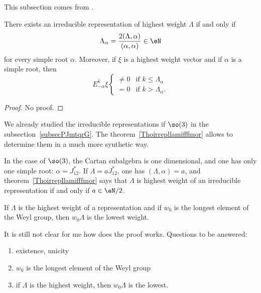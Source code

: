 This subsection comes from \cite{Cornwell}.

\begin{theorem}     \label{Thoirrepllamifffmor}
	There exists an irreducible representation of highest weight $\Lambda$ if and only if
	\begin{equation}
		\Lambda_{\alpha}=\frac{ 2(\Lambda,\alpha) }{ (\alpha,\alpha) }\in\eN
	\end{equation}
	for every simple root $\alpha$. Moreover, if $\xi$ is a highest weight vector and if $\alpha$ is a simple root, then
	\begin{equation}
		E_{-\alpha}^k\xi
		\begin{cases}
			\neq 0 & \text{if }k\leq\Lambda_{\alpha} \\
			=0     & \text{if }k>\Lambda_{\alpha}.
		\end{cases}
	\end{equation}
\end{theorem}

\begin{proof}
	No proof.
\end{proof}

\begin{example} \label{ExHESKimc}
	We already studied the irreducible representations if \( \so(3)\) in the subsection~\ref{subsecPJmtqrG}. The theorem~\ref{Thoirrepllamifffmor} allows to determine them in a much more synthetic way.

	In the case of $\so(3)$, the Cartan subalgebra is one dimensional, and one has only one simple root: $\alpha=J_{12}^*$. If $\Lambda=aJ_{12}^*$, one has $(\Lambda,\alpha)=a$, and theorem~\ref{Thoirrepllamifffmor} says that $\Lambda$ is highest weight of an irreducible representation if and only if $a\in \eN/2$.
\end{example}

\begin{theorem}     \label{ThoLOngestlowestrepres}
	If \( \Lambda\) is the highest weight of a representation and if \( w_0\) is the longest element of the Weyl group, then \( w_0\Lambda\) is the lowest weight.
\end{theorem}

\begin{probleme}
	It is still not clear for me how does the proof works. Questions to be answered:
	\begin{enumerate}
		\item
		      existence, unicity
		\item
		      \( w_0\) is the longest element of the Weyl group
		\item
		      if \( \Lambda\) is the highest weight, then \( w_0\Lambda\) is the lowest.
	\end{enumerate}
\end{probleme}


